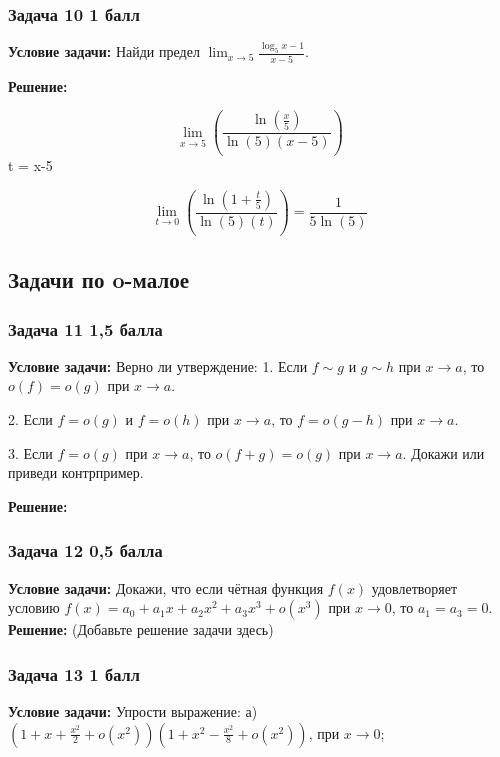 \documentclass[a4paper,12pt]{article}
\begin{document}
\vspace{1cm}

\subsubsection{Задача 10 \hfill 1 балл}
\textbf{Условие задачи:} Найди предел \( \lim_{x \to 5} \frac{\log_5 x - 1}{x - 5} \).

\textbf{Решение: }

\[
\lim_{x \to 5}(\frac{\ln(\frac{x}{5})}{\ln(5)(x-5)}) 
\]
t = x-5

\[
\lim_{t \to 0}(\frac{\ln(1+\frac{t}{5})}{\ln(5)(t)}) = \frac{1}{5\ln(5)}
\]

\vspace{1cm}

\subsection{Задачи по o-малое}

\subsubsection{Задача 11 \hfill 1,5 балла}
\textbf{Условие задачи:} Верно ли утверждение:
1. Если \( f \sim g \) и \( g \sim h \) при \( x \to a \), то \( o(f) = o(g) \) при \( x \to a \).

2. Если \( f = o(g) \) и \( f = o(h) \) при \( x \to a \), то \( f = o(g - h) \) при \( x \to a \).

3. Если \( f = o(g) \) при \( x \to a \), то \( o(f + g) = o(g) \) при \( x \to a \).
Докажи или приведи контрпример.

\textbf{Решение: }


\vspace{1cm}

\subsubsection{Задача 12 \hfill 0,5 балла}
\textbf{Условие задачи:} Докажи, что если чётная функция \( f(x) \) удовлетворяет условию \( f(x) = a_0 + a_1 x + a_2 x^2 + a_3 x^3 + o(x^3) \) при \( x \to 0 \), то \( a_1 = a_3 = 0 \).
\textbf{Решение: } (Добавьте решение задачи здесь)

\vspace{1cm}

\subsubsection{Задача 13 \hfill 1 балл}
\textbf{Условие задачи:} Упрости выражение:
а) \( \left( 1 + x + \frac{x^2}{2} + o(x^2) \right) \left( 1 + x^2 - \frac{x^2}{8} + o(x^2) \right) \), при \( x \to 0 \);
\end{document}

